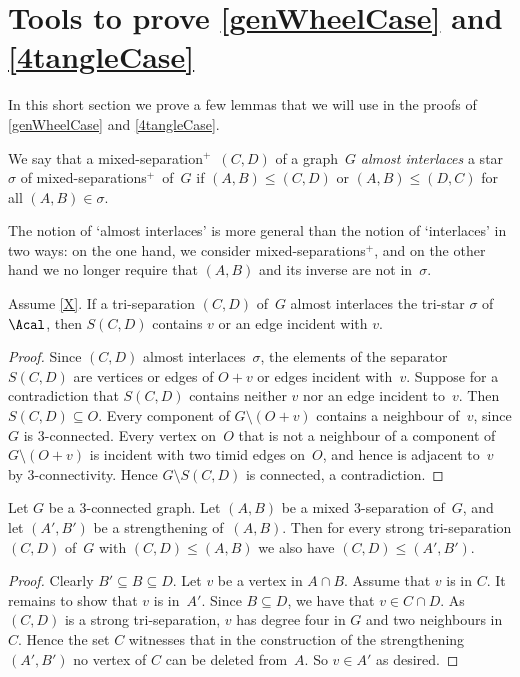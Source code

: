 \documentclass{aic}
\newcommand{\se}{\subseteq}
\theoremstyle{plain}
\theoremstyle{definition}
\theoremstyle{plain}
\newcommand{\plus}{${}^+$}
\theoremstyle{plain}
\newcommand{\sm}{\setminus}
\renewcommand{\leq}{\leqslant}
\begin{document}
\section[Tools to prove (ii) and (iii)]{Tools to prove \ref{genWheelCase} and \ref{4tangleCase}}
In this short section we prove a few lemmas that we will use in the proofs of \ref{genWheelCase} and \ref{4tangleCase}.


\begin{dfn}
We say that a mixed-separation\plus\ $(C,D)$ of a graph~$G$ \emph{almost interlaces} a star $\sigma$ of mixed-separations\plus\ of~$G$ if $(A,B)\leq (C,D)$ or  $(A,B)\leq (D,C)$ for all $(A,B)\in \sigma$.
\end{dfn}
The notion of `almost interlaces' is more general than the notion of `interlaces' in two ways: on the one hand, we consider mixed-separations\plus , and on the other hand we no longer require that $(A,B)$ and its inverse are not in~$\sigma$.




\begin{lem}\label{v17}
Assume \autoref{X}.
If a tri-separation $(C,D)$ of~$G$ almost interlaces the tri-star $\sigma$ of~$\Acal$, then $S(C,D)$ contains $v$ or an edge incident with $v$.
\end{lem}

\begin{proof}
Since $(C,D)$ almost interlaces~$\sigma$, the elements of the separator $S(C,D)$ are vertices or edges of $O+v$ or edges incident with~$v$.
Suppose for a contradiction that $S(C,D)$ contains neither $v$ nor an edge incident to~$v$.
Then $S(C,D)\se O$.
Every component of $G\sm (O+v)$ contains a neighbour of~$v$, since $G$ is 3-connected.
Every vertex on~$O$ that is not a neighbour of a component of $G\sm (O+v)$ is incident with two timid edges on~$O$, and hence is adjacent to~$v$ by 3-connectivity.
Hence $G\sm S(C,D)$ is connected, a contradiction.
\end{proof}

\begin{lem}\label{x13}
Let $G$ be a 3-connected graph.
Let $(A,B)$ be a mixed 3-separation of~$G$, and let $(A',B')$ be a strengthening of~$(A,B)$.
Then for every strong tri-separation $(C,D)$ of~$G$ with $(C,D)\leq (A,B)$ we also have $(C,D)\leq (A',B')$.
\end{lem}


\begin{proof}
Clearly $B'\se B\se D$.
Let $v$ be  a vertex in $A\cap B$. Assume that $v$ is in $C$. It remains to show that $v$ is in~$A'$.
Since $B\se D$, we have that $v\in C\cap D$. 
As $(C,D)$ is a strong tri-separation, $v$ has degree four in $G$ and two neighbours in $C$. 
Hence the set $C$ witnesses that in the construction of the strengthening $(A',B')$ no vertex of $C$ can be deleted from~$A$.
So $v\in A'$ as desired.
\end{proof}
\end{document}
